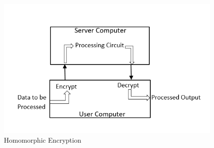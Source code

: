 \begin{figure}[!h]
\centering
\includegraphics[scale=0.75]{figures/Capture.PNG}
\caption{Homomorphic Encryption}
\label{fig:Homomorphic Encryption}
\end{figure}